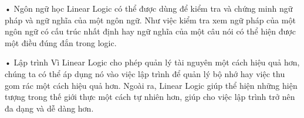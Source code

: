 •	Ngôn ngữ học
Linear Logic có thể được dùng để kiểm tra và chứng minh ngữ pháp và ngữ nghĩa của một ngôn ngữ. Như việc kiểm tra xem ngữ pháp của một ngôn ngữ có cấu trúc nhất định hay ngữ nghĩa của một câu nói có thể hiện được một điều đúng đắn trong logic.


•	Lập trình
Vì Linear Logic cho phép quản lý tài nguyên một cách hiệu quả hơn, chúng ta có thể áp dụng nó vào việc lập trình để quản lý bộ nhớ hay việc thu gom rác một cách hiệu quả hơn. Ngoài ra, Linear Logic giúp thể hiện những hiện tượng trong thế giới thực một cách tự nhiên hơn, giúp cho việc lập trình trở nên đa dạng và dễ dàng hơn.